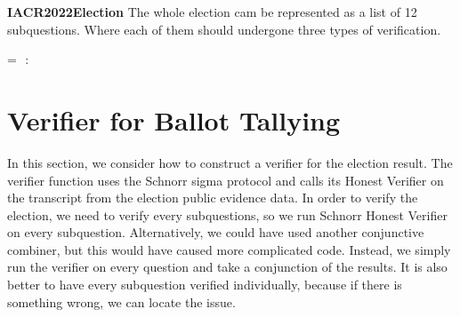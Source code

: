 \textbf{IACR2022Election} The whole election cam be represented as a list of 12 subquestions.
Where each of them should undergone three types of verification.\\
\begin{holmath}
     = \HOLTokenLeftrec{}\,\,:\,\,\,\HOLTokenRightrec{}
\end{holmath} 
\newpage
\section{Verifier for Ballot Tallying}
In this section, we consider how to construct a verifier for the election result. The verifier function uses the 
Schnorr sigma protocol and calls its Honest Verifier on the transcript from the election public evidence data. 
In order to verify the election, we need to verify every subquestions, so we run Schnorr Honest Verifier on every subquestion.
Alternatively, we could have used another conjunctive combiner, but this would have caused more complicated code. 
Instead, we simply run the verifier on every question and take a conjunction of the results. 
It is also better to have every subquestion verified individually, because if there is something wrong, we can locate the issue.

